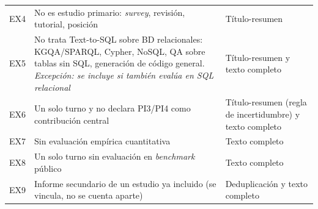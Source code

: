 \begin{table}[!tbp]
\begin{tabularx}{\textwidth}{@{}l X >{\raggedright\arraybackslash}p{3.4cm}@{}}
EX4 & No es estudio primario: \textit{survey}, revisión, tutorial, posición & Título-resumen \\
EX5 & No trata Text-to-SQL sobre BD relacionales: KGQA/SPARQL, Cypher, NoSQL, QA sobre tablas sin SQL, generación de código general. \textit{Excepción: se incluye si también evalúa en SQL relacional} & Título-resumen y texto completo \\
EX6 & Un solo turno y no declara PI3/PI4 como contribución central & Título-resumen (regla de incertidumbre) y texto completo \\
EX7 & Sin evaluación empírica cuantitativa & Texto completo \\
EX8 & Un solo turno sin evaluación en \textit{benchmark} público & Texto completo \\
EX9 & Informe secundario de un estudio ya incluido (se vincula, no se cuenta aparte) & Deduplicación y texto completo \\
\bottomrule
\end{tabularx}
\end{table}
